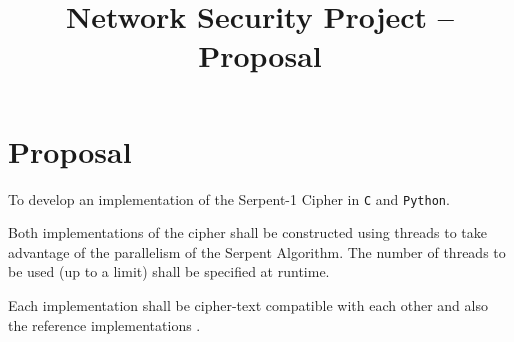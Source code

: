 \documentclass{article}
\title{Network Security Project -- Proposal}
\begin{document}
\maketitle

\section{Proposal}

To develop an implementation of the Serpent-1 Cipher \cite{wikipedia}\cite{homepage} in \texttt{C} and \texttt{Python}.

Both implementations of the cipher shall be constructed using threads to take advantage of the parallelism of the Serpent Algorithm. The number of threads to be used (up to a limit) shall be specified at runtime.

Each implementation shall be cipher-text compatible with each other and also the reference implementations \cite{referenceImplementation}.



\printbibliography
\end{document}

